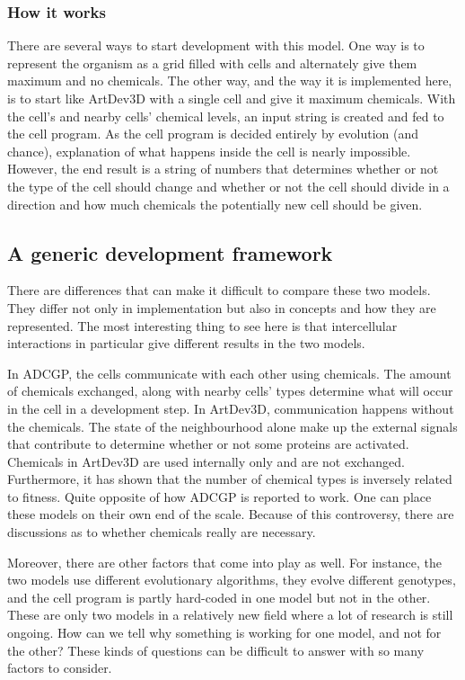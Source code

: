 \subsubsection{How it works}
There are several ways to start development with this model. One way is to represent the organism as a grid filled with cells and alternately give them maximum and no chemicals. The other way, and the way it is implemented here, is to start like ArtDev3D with a single cell and give it maximum chemicals. With the cell's and nearby cells' chemical levels, an input string is created and fed to the cell program. As the cell program is decided entirely by evolution (and chance), explanation of what happens inside the cell is nearly impossible. However, the end result is a string of numbers that determines whether or not the type of the cell should change and whether or not the cell should divide in a direction and how much chemicals the potentially new cell should be given.


\subsection{A generic development framework}
\label{sec:framework_requirements}
There are differences that can make it difficult to compare these two models. They differ not only in implementation but also in concepts and how they are represented. The most interesting thing to see here is that intercellular interactions in particular give different results in the two models.

In ADCGP, the cells communicate with each other using chemicals. The amount of chemicals exchanged, along with nearby cells' types determine what will occur in the cell in a development step. In ArtDev3D, communication happens without the chemicals. The state of the neighbourhood alone make up the external signals that contribute to determine whether or not some proteins are activated. Chemicals in ArtDev3D are used internally only and are not exchanged. Furthermore, it has shown that the number of chemical types is inversely related to fitness. Quite opposite of how ADCGP is reported to work. One can place these models on their own end of the scale. Because of this controversy, there are discussions as to whether chemicals really are necessary.

Moreover, there are other factors that come into play as well. For instance, the two models use different evolutionary algorithms, they evolve different genotypes, and the cell program is partly hard-coded in one model but not in the other. These are only two models in a relatively new field where a lot of research is still ongoing. How can we tell why something is working for one model, and not for the other? These kinds of questions can be difficult to answer with so many factors to consider.

